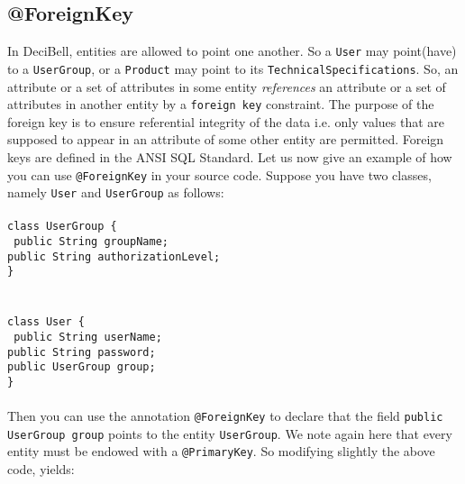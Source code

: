 \documentclass[a4paper,10pt]{article}
\begin{document}
\subsection*{@ForeignKey}\label{foreignkey}
In DeciBell, entities are allowed to point one another. So a \texttt{User} may point(have) to a \texttt{UserGroup}, or
a \texttt{Product} may point to its \texttt{TechnicalSpecifications}. So, an attribute or a set of attributes in some entity
\emph{references} an attribute or a set of attributes in another entity by a \texttt{foreign
key} constraint. The purpose of the foreign key is to ensure referential integrity
of the data i.e. only values that are supposed to appear in an attribute of some other
entity are permitted. Foreign keys are defined in the ANSI SQL Standard. Let us now give
an example of how you can use \texttt{@ForeignKey} in your source code. Suppose you have
two classes, namely \texttt{User} and \texttt{UserGroup} as follows:
\texttt{\\\\class UserGroup \{\\\label{usergroup1}
\hspace*{6}      public String groupName;\\
\hspace*{6}      public String authorizationLevel;\\
\}\\\\\\
class User \{\\\label{user1}
\hspace*{6}   public String userName;\\
\hspace*{6}   public String password;\\
\hspace*{6}   public UserGroup group;\\ 
\}\\
}\\
\noindent
Then you can use the annotation \texttt{@ForeignKey} to declare that 
the field \texttt{public UserGroup group} points to the entity \texttt{UserGroup}.
We note again here that every entity must be endowed with a \texttt{@PrimaryKey}.
So modifying slightly the above code, yields:
\end{document}
